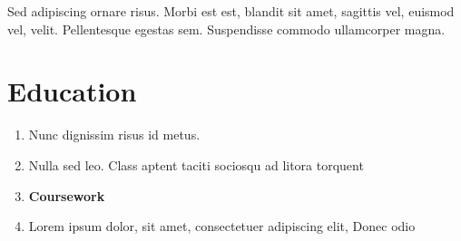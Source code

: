 \documentclass[letterpaper, 11pt]{nycv}
\begin{document}
Sed adipiscing ornare risus. Morbi est est, blandit sit amet, sagittis vel, euismod vel, velit. Pellentesque egestas sem. Suspendisse commodo ullamcorper magna.

\section*{Education}
\begin{leftbar}
\begin{enumerate}
  \item Nunc dignissim risus id metus.
  \item Nulla sed leo. Class aptent taciti sociosqu ad litora torquent
  \item \textbf{Coursework} 
  \item Lorem ipsum dolor, sit amet, consectetuer adipiscing elit, Donec odio
\end{enumerate}
\end{leftbar}



\fancyhf{} %
\renewcommand{\headrulewidth}{0pt}
\end{document}
